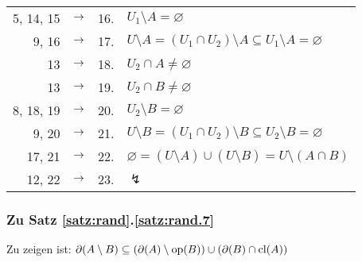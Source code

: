 \begin{longtable}{r c r l}
        5, 14, 15 & $\rightarrow$ & 16. & $U_1 \setminus A = \varnothing$ \\
        9, 16 & $\rightarrow$ & 17. & $U \setminus A = (U_1 \cap U_2) \setminus A \subseteq U_1 \setminus A = \varnothing$ \\
        13 & $\rightarrow$ & 18. & $U_2 \cap A \neq \varnothing$ \\
        13 & $\rightarrow$ & 19. & $U_2 \cap B \neq \varnothing$ \\
        8, 18, 19 & $\rightarrow$ & 20. & $U_2 \setminus B = \varnothing$ \\
        9, 20 & $\rightarrow$ & 21. & $U \setminus B = (U_1 \cap U_2) \setminus B \subseteq U_2 \setminus B = \varnothing $ \\
        17, 21 & $\rightarrow$ & 22. & $\varnothing = (U \setminus A) \cup (U \setminus B) = U \setminus (A \cap B) $ \\
        12, 22 & $\rightarrow$ & 23. & $\lightning$
    \end{longtable}


\subsubsection{Zu Satz \ref{satz:rand}.\ref{satz:rand.7}}\label{anh:rand.7}
    Zu zeigen ist: $\partial(A \setminus B) \subseteq (\partial(A) \setminus \text{op}(B)) \cup (\partial(B) \cap \text{cl}(A))$

